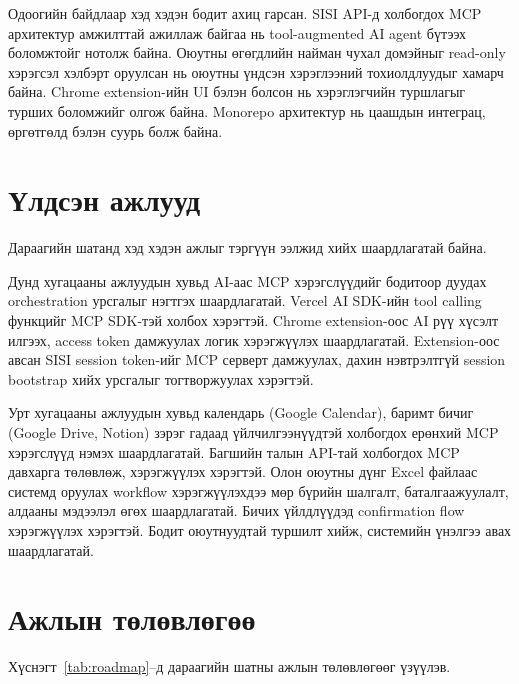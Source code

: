 Одоогийн байдлаар хэд хэдэн бодит ахиц гарсан. SISI API-д холбогдох MCP архитектур амжилттай ажиллаж байгаа нь tool-augmented AI agent бүтээх боломжтойг нотолж байна. Оюутны өгөгдлийн найман чухал домэйныг read-only хэрэгсэл хэлбэрт оруулсан нь оюутны үндсэн хэрэглээний тохиолдлуудыг хамарч байна. Chrome extension-ийн UI бэлэн болсон нь хэрэглэгчийн туршлагыг турших боломжийг олгож байна. Monorepo архитектур нь цаашдын интеграц, өргөтгөлд бэлэн суурь болж байна.

\section{Үлдсэн ажлууд}

Дараагийн шатанд хэд хэдэн ажлыг тэргүүн ээлжид хийх шаардлагатай байна.

Дунд хугацааны ажлуудын хувьд AI-аас MCP хэрэгслүүдийг бодитоор дуудах orchestration урсгалыг нэгтгэх шаардлагатай. Vercel AI SDK-ийн tool calling функцийг MCP SDK-тэй холбох хэрэгтэй. Chrome extension-оос AI рүү хүсэлт илгээх, access token дамжуулах логик хэрэгжүүлэх шаардлагатай. Extension-оос авсан SISI session token-ийг MCP серверт дамжуулах, дахин нэвтрэлтгүй session bootstrap хийх урсгалыг тогтворжуулах хэрэгтэй.

Урт хугацааны ажлуудын хувьд календарь (Google Calendar), баримт бичиг (Google Drive, Notion) зэрэг гадаад үйлчилгээнүүдтэй холбогдох ерөнхий MCP хэрэгслүүд нэмэх шаардлагатай. Багшийн талын API-тай холбогдох MCP давхарга төлөвлөж, хэрэгжүүлэх хэрэгтэй. Олон оюутны дүнг Excel файлаас системд оруулах workflow хэрэгжүүлэхдээ мөр бүрийн шалгалт, баталгаажуулалт, алдааны мэдээлэл өгөх шаардлагатай. Бичих үйлдлүүдэд confirmation flow хэрэгжүүлэх хэрэгтэй. Бодит оюутнуудтай туршилт хийж, системийн үнэлгээ авах шаардлагатай.

\section{Ажлын төлөвлөгөө}

Хүснэгт~\ref{tab:roadmap}--д дараагийн шатны ажлын төлөвлөгөөг үзүүлэв.

